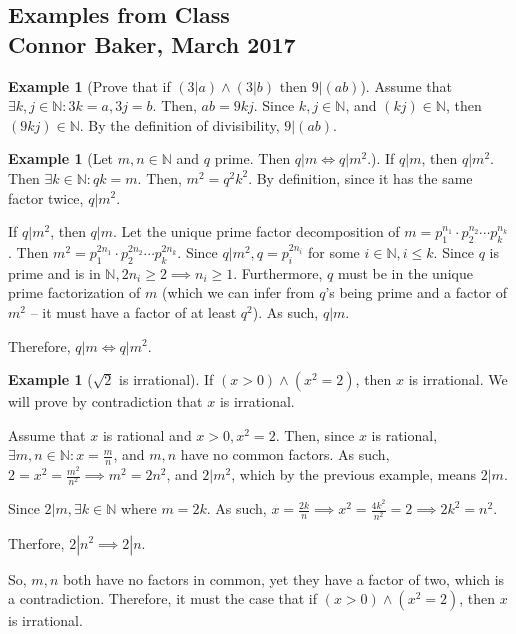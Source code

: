 \documentclass[10pt]{article}
\theoremstyle{definition}
\newtheorem{example}[equation]{Example}
\newcommand{\N}{\mathbb{N}}
\begin{document}
\begin{center}
  \subsection*{Examples from Class\\Connor Baker, March 2017}
\end{center}

\begin{example}[Prove that if $(3|a)\land (3|b)$ then $9|(ab)$]
  Assume that $\exists k,j\in\N:3k=a,3j=b$. Then, $ab=9kj$. Since $k,j\in\N$, and $(kj)\in\N$, then $(9kj)\in\N$. By the definition of divisibility, $9|(ab)$.
\end{example}

\begin{example}[Let $m,n\in\N$ and $q$ prime. Then $q|m\iff q|m^2$.]
  If $q|m$, then $q|m^2$. Then $\exists k\in\N:qk=m$. Then, $m^2=q^2 k^2$. By definition, since it has the same factor twice, $q|m^2$.

  If $q|m^2$, then $q|m$. Let the unique prime factor decomposition of $m=p_1^{n_1}\cdot p_2^{n_2}\cdots p_k^{n_k}$. Then $m^2 = p_1^{2n_1}\cdot p_2^{2n_2}\cdots p_k^{2n_k}$. Since $q|m^2,q=p_i^{2n_i}$ for some $i\in\N,i\leq k$. Since $q$ is prime and is in $\N,2n_i \geq 2 \implies n_i \geq 1$. Furthermore, $q$ must be in the unique prime factorization of $m$ (which we can infer from $q$'s being prime and a factor of $m^2$ -- it must have a factor of at least $q^2$). As such, $q|m$.

  Therefore, $q|m\iff q|m^2$.
\end{example}

\begin{example}[$\sqrt{2}$ is irrational]
  If $(x>0)\land (x^2=2)$, then $x$ is irrational. We will prove by contradiction that $x$ is irrational.

  Assume that $x$ is rational and $x>0,x^2=2$. Then, since $x$ is rational, $\exists m,n\in\N:x=\frac{m}{n}$, and $m,n$ have no common factors. As such, $2=x^2=\frac{m^2}{n^2}\implies m^2=2n^2$, and $2|m^2$, which by the previous example, means $2|m$.

  Since $2|m,\exists k\in\N$ where $m=2k$. As such, $x=\frac{2k}{n}\implies x^2 = \frac{4k^2}{n^2} = 2 \implies 2k^2 = n^2$.

  Therfore, $2|n^2\implies2|n$.

  So, $m,n$ both have no factors in common, yet they have a factor of two, which is a contradiction. Therefore, it must the case that if $(x>0)\land (x^2=2)$, then $x$ is irrational.
\end{example}
\end{document}

